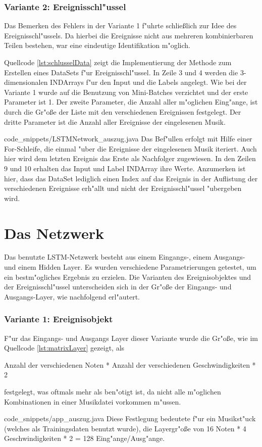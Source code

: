 {\subsubsection{Variante 2: Ereignisschl"ussel}
Das Bemerken des Fehlers in der Variante 1 f"uhrte schlie{\ss}lich zur Idee des Ereignisschl"ussels. Da hierbei die Ereignisse nicht aus mehreren kombinierbaren Teilen bestehen, war eine eindeutige Identifikation m"oglich.

Quellcode \ref{lst:schlusselData} zeigt die Implementierung der Methode zum Erstellen eines DataSets f"ur Ereignisschl"ussel. In Zeile 3 und 4 werden die 3-dimensionalen INDArrays f"ur den Input und die Labels angelegt. Wie bei der Variante 1 wurde auf die Benutzung von Mini-Batches verzichtet und der erste Parameter ist 1. Der zweite Parameter, die Anzahl aller m"oglichen Eing"ange, ist durch die Gr"o{\ss}e der Liste mit den verschiedenen Ereignissen festgelegt. Der dritte Parameter ist die Anzahl aller Ereignisse der eingelesenen Musik.

{code_snippets/LSTMNetwork_auszug.java}
Das Bef"ullen erfolgt mit Hilfe einer For-Schleife, die einmal "uber die Ereignisse der eingelesenen Musik iteriert. Auch hier wird dem letzten Ereignis das Erste als Nachfolger zugewiesen. In den Zeilen 9 und 10 erhalten das Input und Label INDArray ihre Werte. Anzumerken ist hier, dass das DataSet lediglich einen Index auf das Ereignis in der Auflistung der verschiedenen Ereignisse erh"allt und nicht der Ereignisschl"ussel "ubergeben wird.



\section{Das Netzwerk}
Das benutzte LSTM-Netzwerk besteht aus einem Eingangs-, einem Ausgangs- und einem Hidden Layer. Es wurden verschiedene Parametrierungen getestet, um ein bestm"ogliches Ergebnis zu erzielen. Die Varianten des Ereignisobjektes und der Ereignisschl"ussel unterscheiden sich in der Gr"o{\ss}e der  Eingangs- und Ausgangs-Layer, wie nachfolgend erl"autert.

\subsubsection{Variante 1: Ereignisobjekt}
F"ur das Eingangs- und Ausgangs Layer dieser Variante wurde die Gr"o{\ss}e, wie im Quellcode \ref{lst:matrixLayer} gezeigt, als 
\begin{center}{\glqq}Anzahl der verschiedenen Noten{\grqq} * {\glqq}Anzahl der verschiedenen Geschwindigkeiten{\grqq} * 2 \end{center}
festgelegt, was oftmals mehr als ben"otigt ist, da nicht alle m"oglichen Kombinationen in einer Musikdatei vorkommen m"ussen.

{code_snippets/app_auszug.java}
Diese Festlegung bedeutete f"ur ein Musikst"uck (welches als Trainingsdaten benutzt wurde), die Layergr"o{\ss}e von 16 Noten * 4 Geschwindigkeiten * 2 = 128 Eing"ange/Ausg"ange.

}
